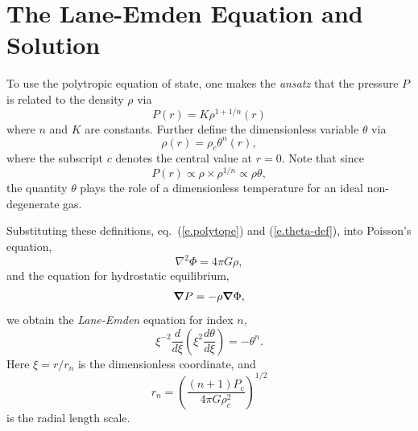 \section{The Lane-Emden Equation and Solution}\label{s.LE-solution}

To use the polytropic equation of state, one makes the \emph{ansatz} that the pressure $P$ is related to the density $\rho$ via
\begin{equation}\label{e.polytope}
P(r) = K\rho^{1+1/n}(r)
\end{equation}
where $n$ and $K$ are constants. Further define the dimensionless variable $\theta$ via
\begin{equation}\label{e.theta-def}
\rho(r) = \rho_{c}\theta^{n}(r),
\end{equation}
where the subscript $c$ denotes the central value at $r=0$. Note that since
\[ P(r) \propto \rho \times \rho^{1/n} \propto \rho \theta, \]
the quantity $\theta$ plays the role of a dimensionless temperature for an ideal non-degenerate gas.

Substituting these definitions, eq.~(\ref{e.polytope}) and (\ref{e.theta-def}), into Poisson's equation,
\begin{equation}
\nabla^{2}\Phi = 4\pi G\rho,
\end{equation}
and the equation for hydrostatic equilibrium, 
\begin{equation}
\boldsymbol{\nabla} P = -\rho\boldsymbol{\nabla} \Phi,
\end{equation}
we obtain the \emph{Lane-Emden} equation for index $n$,
\begin{equation}\label{e.LE}
\xi^{-2} \frac{d}{d\xi}\left(\xi^{2}\frac{d\theta}{d\xi}\right) = -\theta^{n}.
\end{equation}
Here $\xi = r/r_{n}$ is the dimensionless coordinate, and
\begin{equation}\label{e.LE-length-scale}
r_{n} = \left(\frac{(n+1)P_{c}}{4\pi G\rho_{c}^{2}}\right)^{1/2}
\end{equation}
is the radial length scale.

